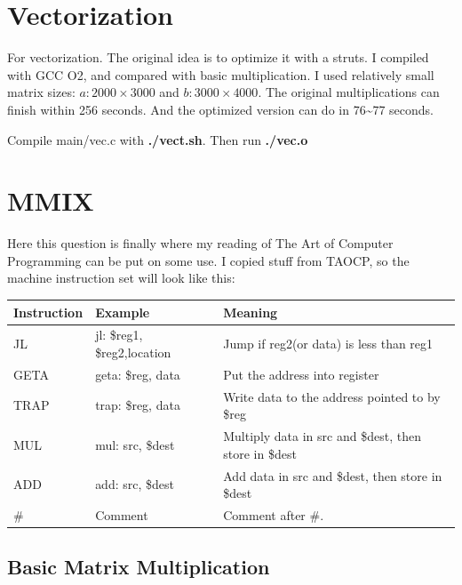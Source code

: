 \documentclass[11pt]{article}
\begin{document}
\section{Vectorization}
\label{sec:orgheadline8}
For vectorization. The original idea is to optimize it with a struts. I compiled with GCC O2, and compared with basic multiplication. I used relatively small 
matrix sizes: \(a: 2000\times 3000\) and \(b: 3000\times 4000\). The original multiplications can finish within 256 seconds. And the optimized version can do in 76\textasciitilde{}77 seconds. 

Compile main/vec.c with \textbf{./vect.sh}. Then run \textbf{./vec.o}



\section{MMIX}
\label{sec:orgheadline11}
Here this question is finally where my reading of The Art of Computer Programming can be put on some use. I copied stuff from TAOCP, so the
machine instruction set will look like this:

\begin{center}
\begin{tabular}{lll}
\hline
\hline
Instruction & Example & Meaning\\
\hline
JL & jl:   \$reg1, \$reg2,location & Jump if reg2(or data) is less than reg1\\
GETA & geta: \$reg,  data & Put the address into register\\
TRAP & trap: \$reg,  data & Write data to the address pointed to by \$reg\\
MUL & mul:  src,  \$dest & Multiply data in src and \$dest, then store in \$dest\\
ADD & add:  src,  \$dest & Add data in src and \$dest, then store in \$dest\\
\# & Comment & Comment after \#.\\
\hline
\end{tabular}
\end{center}


\subsection{Basic Matrix Multiplication}
\label{sec:orgheadline9}
\end{document}
